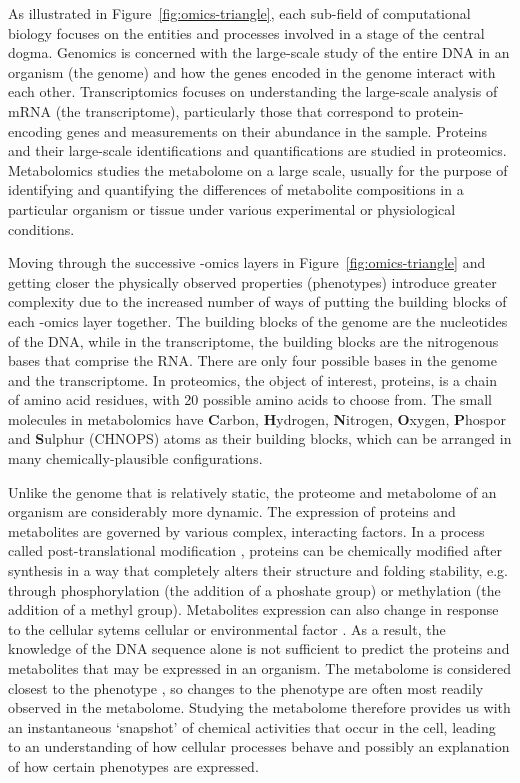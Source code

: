 As illustrated in Figure~\ref{fig:omics-triangle}, each sub-field of computational biology focuses on the entities and processes involved in a stage of the central dogma. Genomics is concerned with the large-scale study of the entire DNA in an organism (the genome) and how the genes encoded in the genome interact with each other. Transcriptomics focuses on understanding the large-scale analysis of mRNA (the transcriptome), particularly those that correspond to protein-encoding genes and measurements on their abundance in the sample. Proteins and their large-scale identifications and quantifications are studied in proteomics. Metabolomics studies the metabolome on a large scale, usually for the purpose of identifying and quantifying the differences of metabolite compositions in a particular organism or tissue under various experimental or physiological conditions. 

Moving through the successive -omics layers in Figure~\ref{fig:omics-triangle} and getting closer the physically observed properties (phenotypes) introduce greater complexity due to the increased number of ways of putting the building blocks of each -omics layer together. The building blocks of the genome are the nucleotides of the DNA, while in the transcriptome, the building blocks are the nitrogenous bases that comprise the RNA. There are only four possible bases in the genome and the transcriptome. In proteomics, the object of interest, proteins, is a chain of amino acid residues, with 20 possible amino acids to choose from. The small molecules in metabolomics have \textbf{C}arbon, \textbf{H}ydrogen, \textbf{N}itrogen, \textbf{O}xygen, \textbf{P}hospor and \textbf{S}ulphur (CHNOPS) atoms as their building blocks, which can be arranged in many chemically-plausible configurations. 

Unlike the genome that is relatively static, the proteome and metabolome of an organism are considerably more dynamic. The expression of proteins and metabolites are governed by various complex, interacting factors. In a process called post-translational modification \cite{mann2003proteomic}, proteins can be chemically modified after synthesis in a way that completely alters their structure and folding stability, e.g. through phosphorylation (the addition of a phoshate group) or methylation (the addition of a methyl group). Metabolites expression can also change in response to the cellular sytems cellular \cite{Panopoulos2012} or environmental factor \cite{Hirai2004}. As a result, the knowledge of the DNA sequence alone is not sufficient to predict the proteins and metabolites that may be expressed in an organism. The metabolome is considered closest to the phenotype \cite{Fiehn2002}, so changes to the phenotype are often most readily observed in the metabolome. Studying the metabolome therefore provides us with an instantaneous `snapshot' of chemical activities that occur in the cell, leading to an understanding of how cellular processes behave and possibly an explanation of how certain phenotypes are expressed.

